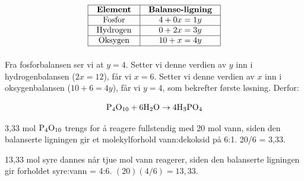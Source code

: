 
$$\vbox{\offinterlineskip
\halign{\strut
\vrule \quad\hfil # \ \hfil & 
\vrule \quad\hfil # \ \hfil \vrule \cr
\noalign{\hrule}
%
{\bf Element} & {\bf Balanse-ligning} \cr
%
\noalign{\hrule}
%
Fosfor & $4 + 0x = 1y$ \cr
%
\noalign{\hrule}
%
Hydrogen & $0 + 2x = 3y$ \cr
%
\noalign{\hrule}
%
Oksygen & $10 + x = 4y$ \cr
%
\noalign{\hrule}
} %
}$$ %

Fra fosforbalansen ser vi at $y = 4$. Setter vi denne verdien av $y$ inn i hydrogenbalansen ($2x = 12$), får vi $x = 6$. Setter vi denne verdien av $x$ inn i oksygenbalansen ($10 + 6 = 4y$), får vi $y = 4$, som bekrefter første løsning. Derfor:

$$\hbox{P}_4\hbox{O}_{10} + \hbox{6H}_2\hbox{O} \to \hbox{4H}_3\hbox{PO}_4$$

\vskip 10pt

3,33 mol $\hbox{P}_4\hbox{O}_{10}$ trengs for å reagere fullstendig med 20 mol vann, siden den balanserte ligningen gir et molekylforhold vann:dekoksid på 6:1. 20/6 = 3,33.

\vskip 10pt

13,33 mol syre dannes når tjue mol vann reagerer, siden den balanserte ligningen gir forholdet syre:vann = 4:6.  $(20)(4/6) = 13,33$.





